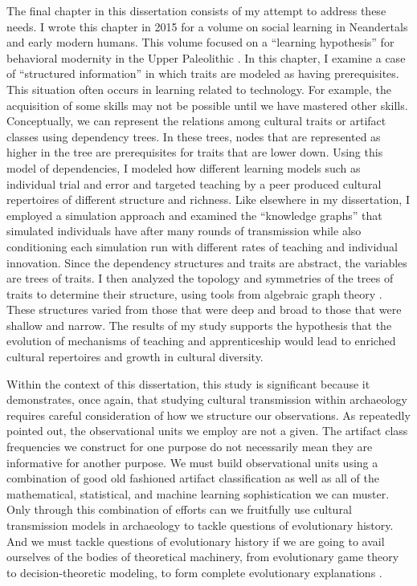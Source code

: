 The final chapter in this dissertation consists of my attempt to address these needs.  I wrote this chapter in 2015 for a volume on social learning in Neandertals and early modern humans. This volume focused on a ``learning hypothesis'' for behavioral modernity in the Upper Paleolithic  \citep{Nishiaki2013}.  In this chapter, I examine a case of  ``structured information'' in which traits are modeled as having prerequisites. This situation often occurs in learning related to technology. For example, the acquisition of some skills may not be possible until we have mastered other skills. Conceptually, we can represent the relations among cultural traits or artifact classes using dependency trees. In these trees, nodes that are represented as higher in the tree are prerequisites for traits that are lower down.  Using this model of dependencies, I modeled how different learning models such as individual trial and error and targeted teaching by a peer produced cultural repertoires of different structure and richness. Like elsewhere in my dissertation, I employed a simulation approach and examined the ``knowledge graphs'' that simulated individuals have after many rounds of transmission while also conditioning each simulation run with different rates of teaching and individual innovation. Since the dependency structures and traits are abstract, the variables are trees of traits. I then analyzed the topology and symmetries of the trees of traits to determine their structure, using tools from algebraic graph theory \citep{Godsil2001}. These structures varied from those that were deep and broad to those that were shallow and narrow. The results of my study supports the hypothesis that the evolution of mechanisms of teaching and apprenticeship would lead to enriched cultural repertoires and growth in cultural diversity.

Within the context of this dissertation, this study is significant because it demonstrates, once again, that studying cultural transmission within archaeology requires careful consideration of how we structure our observations. As \citet{Dunnell1971,dunnell1986methodological} repeatedly pointed out, the observational units we employ are not a given. The artifact class frequencies we construct for  one purpose do not necessarily mean they are informative for another purpose. We must build observational units using a combination of good old fashioned artifact classification as well as all of the mathematical, statistical, and machine learning sophistication we can muster. Only through this combination of efforts can we fruitfully use cultural transmission models in archaeology to tackle questions of evolutionary history. And we must tackle questions of evolutionary history if we are going to avail ourselves of the bodies of theoretical machinery, from evolutionary game theory to decision-theoretic modeling, to form complete evolutionary explanations .